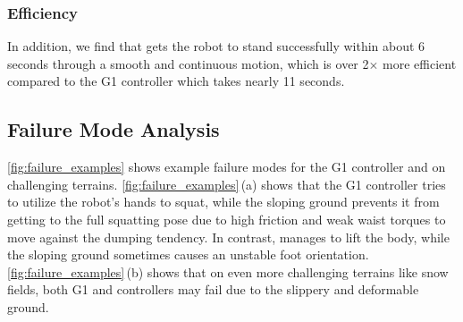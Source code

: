 \subsubsection{Efficiency}
In addition, we find that \ours gets the robot to stand successfully within about 6 seconds through a smooth and continuous motion, which is over 2$\times$ more efficient compared to the G1 controller which takes nearly 11 seconds.

\subsection{Failure Mode Analysis} 
\cref{fig:failure_examples} shows example failure modes for the G1 controller and \ours on challenging terrains.
\cref{fig:failure_examples}\,(a) shows that the G1 controller tries to utilize the robot's hands to squat, while the sloping ground prevents it from getting to the full squatting pose due to high friction and weak waist torques to move against the dumping tendency.
In contrast, \ours manages to lift the body, while the sloping ground sometimes causes an unstable foot orientation.
\cref{fig:failure_examples}\,(b) shows that on even more challenging terrains like snow fields, both G1 and \ours controllers may fail due to the slippery and deformable ground.